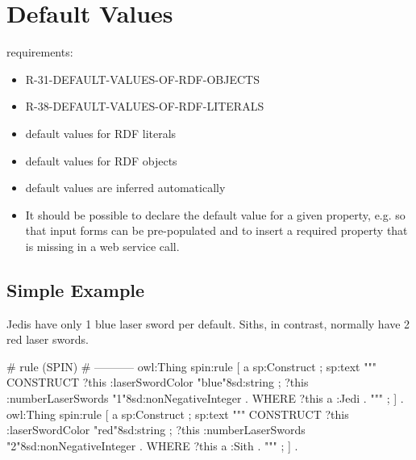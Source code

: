 \documentclass{llncs}
\newcommand{\an}[1]{\todo[size=\small, color=green!40]{\textbf{Andy:} #1}}
\begin{document}
\an{not sure!}

\section{Default Values}

requirements:

\begin{itemize}
	\item R-31-DEFAULT-VALUES-OF-RDF-OBJECTS
  \item R-38-DEFAULT-VALUES-OF-RDF-LITERALS
\end{itemize}



\begin{itemize}
	\item default values for RDF literals
	\item default values for RDF objects
	\item default values are inferred automatically
	\item It should be possible to declare the default value for a given property, e.g. so that input forms can be pre-populated and to insert a required property that is missing in a web service call. 
\end{itemize}

\subsection{Simple Example}

Jedis have only 1 blue laser sword per default.
Siths, in contrast, normally have 2 red laser swords.

\begin{ex}
# rule (SPIN)
# -----------
owl:Thing
    spin:rule [
        a sp:Construct ;
            sp:text """
                CONSTRUCT {            
                    ?this :laserSwordColor "blue"^^xsd:string ;
                    ?this :numberLaserSwords "1"^^xsd:nonNegativeInteger . 
                }
                WHERE {             
                    ?this a :Jedi .            
                } """ ; ] .
owl:Thing
    spin:rule [
        a sp:Construct ;
            sp:text """
                CONSTRUCT {
                    ?this :laserSwordColor "red"^^xsd:string ;
                    ?this :numberLaserSwords "2"^^xsd:nonNegativeInteger . 
                }
                WHERE {             
                    ?this a :Sith .            
                } """ ; ] .
\end{ex}
\end{document}
